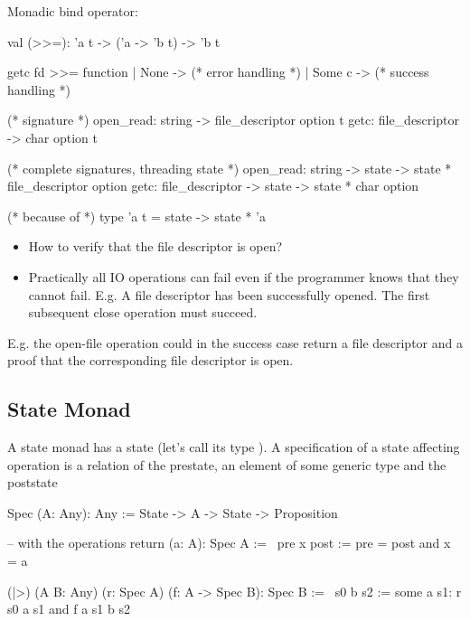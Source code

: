 \noindent Monadic bind operator:
\begin{ocaml}
  val (>>=): 'a t -> ('a -> 'b t) -> 'b t
\end{ocaml}


\begin{ocaml}
  getc fd >>= function
  | None ->
    (* error handling *)
  | Some c ->
    (* success handling *)

  (* signature *)
  open_read: string -> file_descriptor option t
  getc: file_descriptor -> char option t

  (* complete signatures, threading state *)
  open_read: string -> state -> state * file_descriptor option
  getc: file_descriptor -> state -> state * char option

  (* because of *)
  type 'a t = state -> state * 'a
\end{ocaml}
%

\begin{itemize}
\item How to verify that the file descriptor is open?


\item Practically all IO operations can fail even if the programmer knows that
  they cannot fail. E.g. A file descriptor has been successfully opened. The
  first subsequent close operation must succeed.

\end{itemize}


E.g. the open-file operation could in the success case return a file
descriptor and a proof that the corresponding file descriptor is open.




\subsection {State Monad}

A state monad has a state (let's call its type ). A specification of
a state affecting operation is a relation of the prestate, an element of some
generic type and the poststate
%
\begin{alba}
    Spec (A: Any): Any :=
        State -> A -> State -> Proposition

    -- with the operations
    return (a: A): Spec A :=
        \ pre x post :=
            pre = post and x = a

    (|>) (A B: Any) (r: Spec A) (f: A -> Spec B): Spec B :=
        \ s0 b s2 :=
            some a s1:
                r s0 a s1
                and f a s1 b s2
\end{alba}

